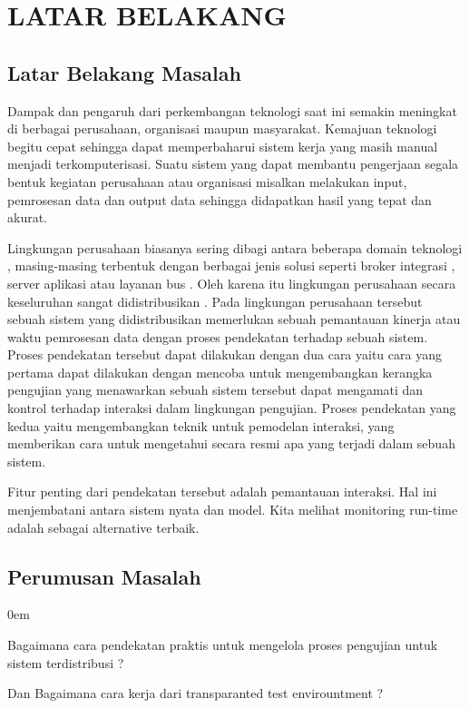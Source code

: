 \documentclass{jtetiproposalskripsi}
\begin{document}
\tableofcontents
{}
\clearpage{}\setcounter{page}{1}

\chapter{LATAR BELAKANG}

\section{Latar Belakang Masalah}
Dampak dan pengaruh dari perkembangan teknologi saat ini semakin meningkat  di berbagai perusahaan, organisasi maupun masyarakat. Kemajuan teknologi begitu cepat sehingga dapat memperbaharui sistem kerja yang masih manual menjadi terkomputerisasi. Suatu sistem yang dapat membantu pengerjaan segala bentuk kegiatan perusahaan atau organisasi misalkan melakukan input, pemrosesan data dan output data sehingga didapatkan hasil yang tepat dan akurat.

Lingkungan perusahaan biasanya sering dibagi antara beberapa domain teknologi , masing-masing terbentuk dengan berbagai jenis  solusi seperti broker integrasi , server aplikasi atau layanan bus . Oleh karena itu lingkungan perusahaan  secara keseluruhan sangat didistribusikan . 
Pada lingkungan perusahaan tersebut sebuah sistem yang didistribusikan memerlukan sebuah pemantauan kinerja atau waktu pemrosesan data dengan proses pendekatan terhadap sebuah sistem.  Proses pendekatan tersebut dapat dilakukan dengan dua cara yaitu cara yang pertama dapat dilakukan dengan mencoba untuk mengembangkan kerangka pengujian yang menawarkan sebuah sistem tersebut dapat mengamati dan kontrol terhadap interaksi dalam lingkungan pengujian. Proses pendekatan yang kedua yaitu mengembangkan teknik untuk pemodelan interaksi, yang memberikan cara untuk mengetahui secara resmi apa yang terjadi dalam sebuah sistem.

Fitur penting dari pendekatan tersebut adalah pemantauan interaksi. Hal ini menjembatani antara sistem nyata dan model. Kita melihat monitoring run-time adalah sebagai alternative terbaik.

\section{Perumusan Masalah}
\begin{enumerate}[a.]
\begin{singlespace}
\itemsep0em
\item Bagaimana cara pendekatan praktis untuk mengelola proses pengujian untuk  sistem terdistribusi ?
\item Dan Bagaimana cara kerja dari transparanted test envirountment ?
\end{singlespace}
\end{enumerate}
\end{document}
